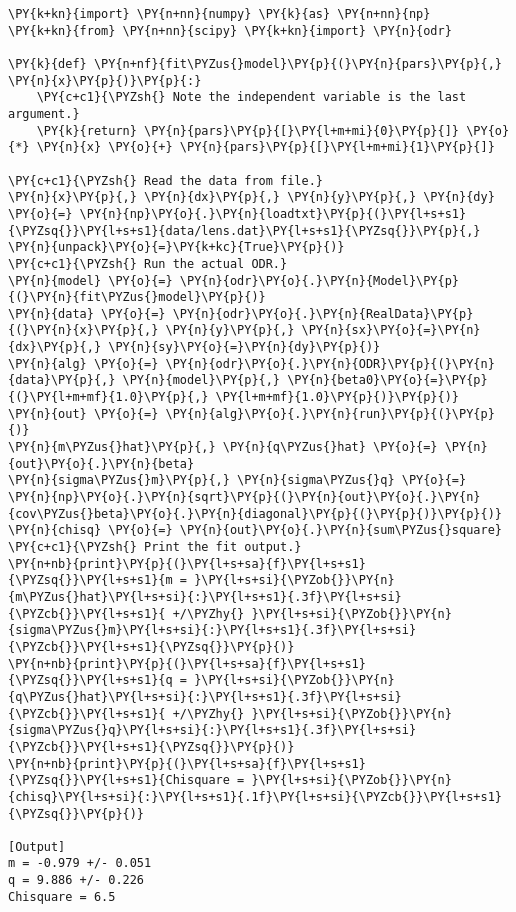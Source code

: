 \begin{Verbatim}[label=\makebox{\href{https://bitbucket.org/lbaldini/statnotes/src/master/snippets/odr.py}{https://bitbucket.org/.../odr.py}},commandchars=\\\{\}]
\PY{k+kn}{import} \PY{n+nn}{numpy} \PY{k}{as} \PY{n+nn}{np}
\PY{k+kn}{from} \PY{n+nn}{scipy} \PY{k+kn}{import} \PY{n}{odr}

\PY{k}{def} \PY{n+nf}{fit\PYZus{}model}\PY{p}{(}\PY{n}{pars}\PY{p}{,} \PY{n}{x}\PY{p}{)}\PY{p}{:}
    \PY{c+c1}{\PYZsh{} Note the independent variable is the last argument.}
    \PY{k}{return} \PY{n}{pars}\PY{p}{[}\PY{l+m+mi}{0}\PY{p}{]} \PY{o}{*} \PY{n}{x} \PY{o}{+} \PY{n}{pars}\PY{p}{[}\PY{l+m+mi}{1}\PY{p}{]}

\PY{c+c1}{\PYZsh{} Read the data from file.}
\PY{n}{x}\PY{p}{,} \PY{n}{dx}\PY{p}{,} \PY{n}{y}\PY{p}{,} \PY{n}{dy} \PY{o}{=} \PY{n}{np}\PY{o}{.}\PY{n}{loadtxt}\PY{p}{(}\PY{l+s+s1}{\PYZsq{}}\PY{l+s+s1}{data/lens.dat}\PY{l+s+s1}{\PYZsq{}}\PY{p}{,} \PY{n}{unpack}\PY{o}{=}\PY{k+kc}{True}\PY{p}{)}
\PY{c+c1}{\PYZsh{} Run the actual ODR.}
\PY{n}{model} \PY{o}{=} \PY{n}{odr}\PY{o}{.}\PY{n}{Model}\PY{p}{(}\PY{n}{fit\PYZus{}model}\PY{p}{)}
\PY{n}{data} \PY{o}{=} \PY{n}{odr}\PY{o}{.}\PY{n}{RealData}\PY{p}{(}\PY{n}{x}\PY{p}{,} \PY{n}{y}\PY{p}{,} \PY{n}{sx}\PY{o}{=}\PY{n}{dx}\PY{p}{,} \PY{n}{sy}\PY{o}{=}\PY{n}{dy}\PY{p}{)}
\PY{n}{alg} \PY{o}{=} \PY{n}{odr}\PY{o}{.}\PY{n}{ODR}\PY{p}{(}\PY{n}{data}\PY{p}{,} \PY{n}{model}\PY{p}{,} \PY{n}{beta0}\PY{o}{=}\PY{p}{(}\PY{l+m+mf}{1.0}\PY{p}{,} \PY{l+m+mf}{1.0}\PY{p}{)}\PY{p}{)}
\PY{n}{out} \PY{o}{=} \PY{n}{alg}\PY{o}{.}\PY{n}{run}\PY{p}{(}\PY{p}{)}
\PY{n}{m\PYZus{}hat}\PY{p}{,} \PY{n}{q\PYZus{}hat} \PY{o}{=} \PY{n}{out}\PY{o}{.}\PY{n}{beta}
\PY{n}{sigma\PYZus{}m}\PY{p}{,} \PY{n}{sigma\PYZus{}q} \PY{o}{=} \PY{n}{np}\PY{o}{.}\PY{n}{sqrt}\PY{p}{(}\PY{n}{out}\PY{o}{.}\PY{n}{cov\PYZus{}beta}\PY{o}{.}\PY{n}{diagonal}\PY{p}{(}\PY{p}{)}\PY{p}{)}
\PY{n}{chisq} \PY{o}{=} \PY{n}{out}\PY{o}{.}\PY{n}{sum\PYZus{}square}
\PY{c+c1}{\PYZsh{} Print the fit output.}
\PY{n+nb}{print}\PY{p}{(}\PY{l+s+sa}{f}\PY{l+s+s1}{\PYZsq{}}\PY{l+s+s1}{m = }\PY{l+s+si}{\PYZob{}}\PY{n}{m\PYZus{}hat}\PY{l+s+si}{:}\PY{l+s+s1}{.3f}\PY{l+s+si}{\PYZcb{}}\PY{l+s+s1}{ +/\PYZhy{} }\PY{l+s+si}{\PYZob{}}\PY{n}{sigma\PYZus{}m}\PY{l+s+si}{:}\PY{l+s+s1}{.3f}\PY{l+s+si}{\PYZcb{}}\PY{l+s+s1}{\PYZsq{}}\PY{p}{)}
\PY{n+nb}{print}\PY{p}{(}\PY{l+s+sa}{f}\PY{l+s+s1}{\PYZsq{}}\PY{l+s+s1}{q = }\PY{l+s+si}{\PYZob{}}\PY{n}{q\PYZus{}hat}\PY{l+s+si}{:}\PY{l+s+s1}{.3f}\PY{l+s+si}{\PYZcb{}}\PY{l+s+s1}{ +/\PYZhy{} }\PY{l+s+si}{\PYZob{}}\PY{n}{sigma\PYZus{}q}\PY{l+s+si}{:}\PY{l+s+s1}{.3f}\PY{l+s+si}{\PYZcb{}}\PY{l+s+s1}{\PYZsq{}}\PY{p}{)}
\PY{n+nb}{print}\PY{p}{(}\PY{l+s+sa}{f}\PY{l+s+s1}{\PYZsq{}}\PY{l+s+s1}{Chisquare = }\PY{l+s+si}{\PYZob{}}\PY{n}{chisq}\PY{l+s+si}{:}\PY{l+s+s1}{.1f}\PY{l+s+si}{\PYZcb{}}\PY{l+s+s1}{\PYZsq{}}\PY{p}{)}

[Output]
m = -0.979 +/- 0.051
q = 9.886 +/- 0.226
Chisquare = 6.5
\end{Verbatim}